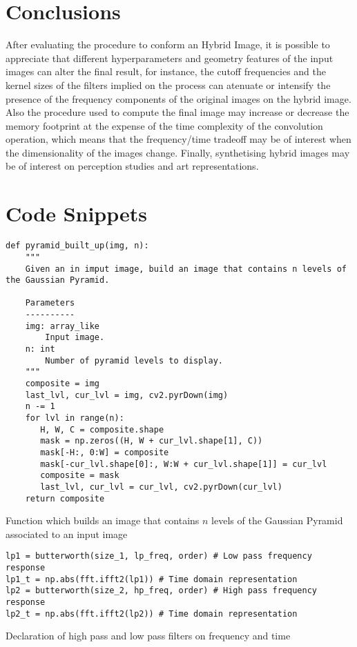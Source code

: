 \documentclass{article}
\begin{document}
\section{Conclusions}
After evaluating the procedure to conform an Hybrid Image, it is possible to appreciate that different hyperparameters and geometry features of the input images can alter the final result, for instance, the cutoff frequencies and the kernel sizes of the filters implied on the process can atenuate or intensify the presence of the frequency components of the original images on the hybrid image. Also the procedure used to compute the final image may increase or decrease the memory footprint at the expense of the time complexity of the convolution operation, which means that the frequency/time tradeoff may be of interest when the dimensionality of the images change. Finally, synthetising hybrid images may be of interest on perception studies and art representations. 


 

\nocite{*}
\printbibliography

\newpage
\section{Code Snippets}

\begin{listing}[H]
	\begin{verbatim}
def pyramid_built_up(img, n):
    """
    Given an in imput image, build an image that contains n levels of the Gaussian Pyramid.

    Parameters
    ----------
    img: array_like
        Input image.
    n: int
        Number of pyramid levels to display.
    """
    composite = img
    last_lvl, cur_lvl = img, cv2.pyrDown(img)
    n -= 1
    for lvl in range(n):
       H, W, C = composite.shape
       mask = np.zeros((H, W + cur_lvl.shape[1], C))
       mask[-H:, 0:W] = composite
       mask[-cur_lvl.shape[0]:, W:W + cur_lvl.shape[1]] = cur_lvl
       composite = mask
       last_lvl, cur_lvl = cur_lvl, cv2.pyrDown(cur_lvl)
    return composite
	\end{verbatim}
	\caption{Function which builds an image that contains $n$ levels of the Gaussian Pyramid associated to an input image}
\end{listing}


\begin{listing}[H]
	\begin{verbatim}
lp1 = butterworth(size_1, lp_freq, order) # Low pass frequency response
lp1_t = np.abs(fft.ifft2(lp1)) # Time domain representation
lp2 = butterworth(size_2, hp_freq, order) # High pass frequency response
lp2_t = np.abs(fft.ifft2(lp2)) # Time domain representation
\end{verbatim}
\caption{Declaration of high pass and low pass filters on frequency and time}
\end{listing}
\end{document}
